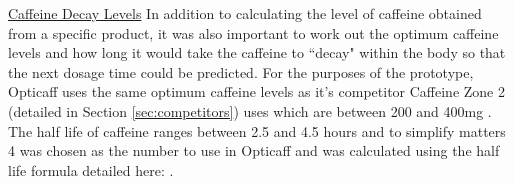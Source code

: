 \underline{Caffeine Decay Levels} \newline
In addition to calculating the level of caffeine obtained from a specific product, it was also important to work out the optimum caffeine levels and how long it would take the caffeine to ``decay" within the body so that the next dosage time could be predicted. For the purposes of the prototype, Opticaff uses the same optimum caffeine levels as it's competitor Caffeine Zone 2 (detailed in Section \ref{sec:competitors}) uses which are between 200 and 400mg \cite{CaffeineZoneInfo}. The half life of caffeine ranges between 2.5 and 4.5 hours \cite{CaffeinePharmacology} \cite{CaffeinePharmacy} and to simplify matters 4 was chosen as the number to use in Opticaff and was calculated using the half life formula detailed here: \cite{HalfLife}.
 
